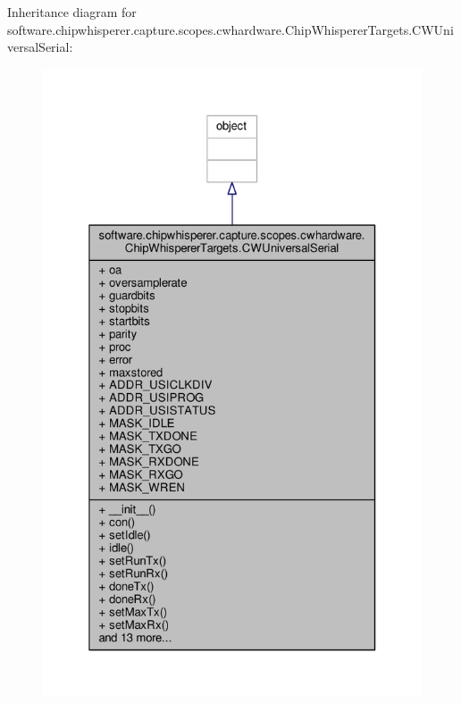Inheritance diagram for software.\+chipwhisperer.\+capture.\+scopes.\+cwhardware.\+Chip\+Whisperer\+Targets.\+C\+W\+Universal\+Serial\+:\nopagebreak
\begin{figure}[H]
\begin{center}
\leavevmode
\includegraphics[width=325pt]{d8/d03/classsoftware_1_1chipwhisperer_1_1capture_1_1scopes_1_1cwhardware_1_1ChipWhispererTargets_1_1CWUniversalSerial__inherit__graph}
\end{center}
\end{figure}


